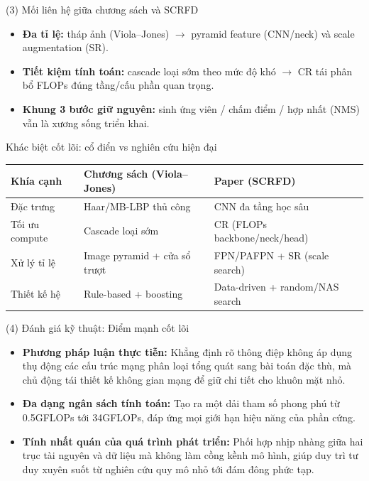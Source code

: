\documentclass[aspectratio=169,11pt]{beamer}
\begin{document}
\begin{frame}{(3) Mối liên hệ giữa chương sách và SCRFD}
  \begin{itemize}
    \setlength{\itemsep}{5pt}
    \item \textbf{Đa tỉ lệ:} tháp ảnh (Viola--Jones) \(\rightarrow\) pyramid feature (CNN/neck) và scale augmentation (SR).\ \cite{li2012facechapter,guo2022scrfd}
    \item \textbf{Tiết kiệm tính toán:} cascade loại sớm theo mức độ khó \(\rightarrow\) CR tái phân bổ FLOPs đúng tầng/cấu phần quan trọng.
    \item \textbf{Khung 3 bước giữ nguyên:} sinh ứng viên / chấm điểm / hợp nhất (NMS) vẫn là xương sống triển khai.
  \end{itemize}
\end{frame}

\begin{frame}{Khác biệt cốt lõi: cổ điển vs nghiên cứu hiện đại}
  \small
  \renewcommand{\arraystretch}{1.15}
  \begin{tabular}{@{}>{\raggedright\arraybackslash}p{}>{\raggedright\arraybackslash}p{}>{\raggedright\arraybackslash}p{}@{}}
    \toprule
    \textbf{Khía cạnh} & \textbf{Chương sách (Viola--Jones)} & \textbf{Paper (SCRFD)} \\
    \midrule
    Đặc trưng & Haar/MB-LBP thủ công & CNN đa tầng học sâu \\
    Tối ưu compute & Cascade loại sớm & CR (FLOPs backbone/neck/head) \\
    Xử lý tỉ lệ & Image pyramid + cửa sổ trượt & FPN/PAFPN + SR (scale search) \\
    Thiết kế hệ & Rule-based + boosting & Data-driven + random/NAS search \\
    \bottomrule
  \end{tabular}
\end{frame}

\begin{frame}{(4) Đánh giá kỹ thuật: Điểm mạnh cốt lõi}
  \begin{itemize}
    \setlength{\itemsep}{8pt}
    \item \textbf{Phương pháp luận thực tiễn:} Khẳng định rõ thông điệp không áp dụng thụ động các cấu trúc mạng phân loại tổng quát sang bài toán đặc thù, mà chủ động tái thiết kế không gian mạng để giữ chi tiết cho khuôn mặt nhỏ.
    \item \textbf{Đa dạng ngân sách tính toán:} Tạo ra một dải tham số phong phú từ 0.5GFLOPs tới 34GFLOPs, đáp ứng mọi giới hạn hiệu năng của phần cứng.\ \cite{guo2022scrfd}
    \item \textbf{Tính nhất quán của quá trình phát triển:} Phối hợp nhịp nhàng giữa hai trục tài nguyên và dữ liệu mà không làm cồng kềnh mô hình, giúp duy trì tư duy xuyên suốt từ nghiên cứu quy mô nhỏ tới đám đông phức tạp.
  \end{itemize}
\end{frame}
\end{document}

